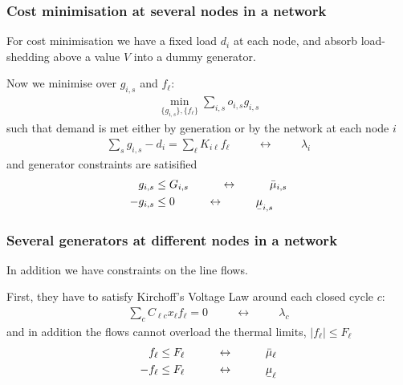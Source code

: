 \documentclass[10pt,dvipsnames]{beamer}
\def\l{\lambda}
\def\m{\mu}
\newcommand{\ubar}[1]{\text{\b{$#1$}}}
\begin{document}
\begin{frame}[fragile]
  \frametitle{Cost minimisation at several nodes in a network}

  For cost minimisation we have a fixed load $d_i$ at each node, and
  absorb load-shedding above a value $V$ into a dummy generator.

  Now we minimise over $g_{i,s}$ and $f_\ell$:
  \begin{align*}
    \min_{\{g_{i,s}\},\{f_\ell\}}  \sum_{i,s} o_{i,s} g_{i,s}
  \end{align*}
  such that demand is met either by generation or by the network at each node $i$
  \begin{align*}
    \sum_{s} g_{i,s} - d_i = \sum_\ell K_{i\ell}f_\ell  \hspace{1cm}\leftrightarrow\hspace{1cm} \l_i
  \end{align*}
  and generator constraints are satisified
    \begin{align*}
        g_{i,s}  & \leq  G_{i,s}  \hspace{1cm}\leftrightarrow\hspace{1cm} \bar{\m}_{i,s} \\
    - g_{i,s}  & \leq  0  \hspace{1cm}\leftrightarrow\hspace{1cm} \ubar{\m}_{i,s}
  \end{align*}



\end{frame}

\begin{frame}[fragile]
  \frametitle{Several generators at different nodes in a network}

  In addition we have constraints on the line flows.

  First, they have to satisfy Kirchoff's Voltage Law around each closed cycle $c$:
  \begin{align*}
    \sum_{c} C_{\ell c} x_\ell f_\ell = 0  \hspace{1cm}\leftrightarrow\hspace{1cm} \l_c
  \end{align*}
  and in addition the flows cannot overload the thermal limits, $|f_\ell| \leq F_\ell$
  \begin{align*}
    f_\ell \leq F_\ell  \hspace{1cm}\leftrightarrow\hspace{1cm} \bar{\m}_\ell \\
        - f_\ell \leq F_\ell  \hspace{1cm}\leftrightarrow\hspace{1cm} \ubar{\m}_\ell
  \end{align*}

\end{frame}
\end{document}

